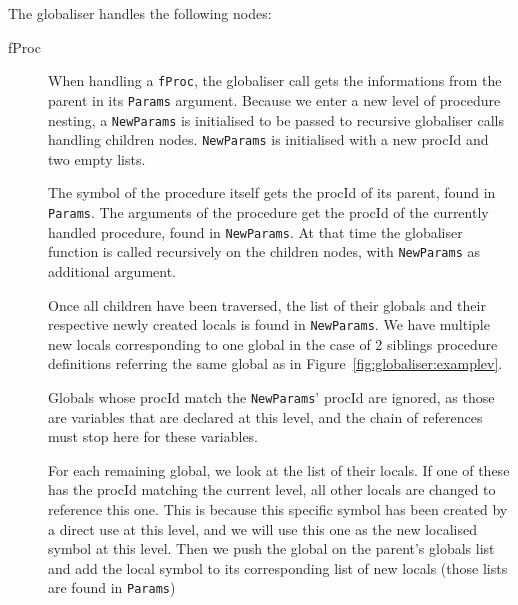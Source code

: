 \documentclass[a4paper]{memoir}
\begin{document}
The globaliser handles the following nodes:
\begin{description}
   \item[fProc] When handling a \lstinline!fProc!, the globaliser call gets the
     informations from the parent in its \lstinline!Params! argument. Because we
     enter a new level of procedure nesting, a \lstinline!NewParams! is
     initialised to be passed to recursive globaliser calls handling children
     nodes. \lstinline!NewParams! is initialised with a new procId and two empty lists. 

      The symbol of the procedure itself gets the procId of its parent, found in \lstinline!Params!. The arguments of the procedure get the procId of the currently handled procedure, found in \lstinline!NewParams!. At that time the globaliser function is called recursively on the children nodes, with \lstinline!NewParams! as additional argument.

      Once all children have been traversed, the list of their globals and their
      respective newly created locals is found in \lstinline!NewParams!.  We
      have multiple new locals corresponding to one global in the case of 2
      siblings procedure definitions referring the same global as in
      Figure~\ref{fig:globaliser:examplev}. 

      Globals whose procId match the \lstinline!NewParams!' procId are ignored, as those are variables that are declared at this level, and the chain of references must stop here for these variables.

      For each remaining global, we look at the list of their locals. 
      If one of these has the procId matching the current level, all other locals are changed to reference this one. This is because this specific symbol has been created by a direct use at this level, and we will use this one as the new localised symbol at this level. Then we push the global on the parent's globals list and add the local symbol to its corresponding list of new locals (those lists are found in \lstinline!Params!)


\end{description}
\end{document}
